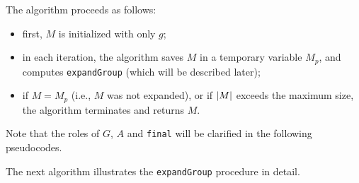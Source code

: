 The algorithm proceeds as follows:

\begin{itemize}
    \item first, $M$ is initialized with only $g$;
    \item in each iteration, the algorithm saves $M$ in a temporary variable $M_p$, and computes \texttt{expandGroup} (which will be described later);
    \item if $M = M_p$ (i.e., $M$ was not expanded), or if $\left|M\right|$ exceeds the maximum size, the algorithm terminates and returns $M$.
\end{itemize}

Note that the roles of $G$, $A$ and \texttt{final} will be clarified in the following pseudocodes.

The next algorithm illustrates the \texttt{expandGroup} procedure in detail.

